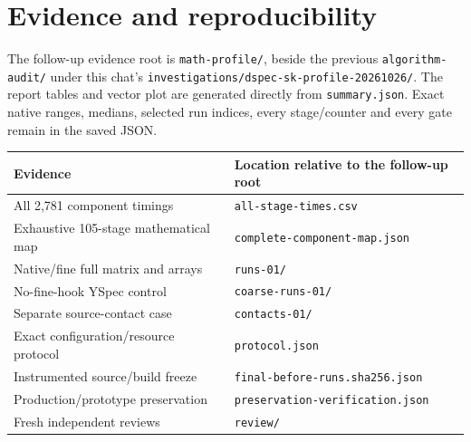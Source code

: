 \section{Evidence and reproducibility}
The follow-up evidence root is \texttt{math-profile/}, beside the previous \texttt{algorithm-audit/} under this chat's \texttt{investigations/dspec-sk-profile-20261026/}. The report tables and vector plot are generated directly from \texttt{summary.json}. Exact native ranges, medians, selected run indices, every stage/counter and every gate remain in the saved JSON.
\begin{center}\small\begin{tabular}{p{}p{}}\toprule
Evidence & Location relative to the follow-up root\\\midrule
All 2,781 component timings & \texttt{all-stage-times.csv}\\
Exhaustive 105-stage mathematical map & \texttt{complete-component-map.json}\\
Native/fine full matrix and arrays & \texttt{runs-01/}\\
No-fine-hook YSpec control & \texttt{coarse-runs-01/}\\
Separate source-contact case & \texttt{contacts-01/}\\
Exact configuration/resource protocol & \texttt{protocol.json}\\
Instrumented source/build freeze & \texttt{final-before-runs.sha256.json}\\
Production/prototype preservation & \texttt{preservation-verification.json}\\
Fresh independent reviews & \texttt{review/}\\
\bottomrule\end{tabular}\end{center}

